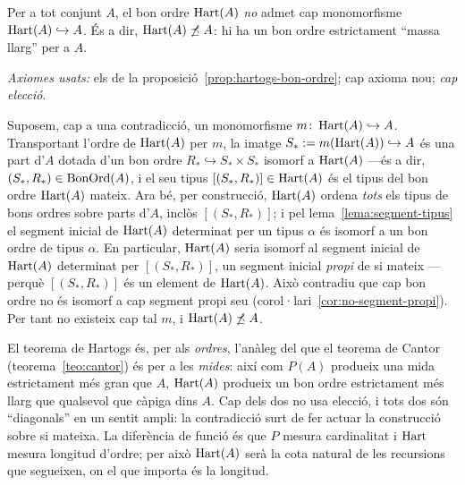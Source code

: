 \begin{teorema}[Hartogs]\label{teo:hartogs}
Per a tot conjunt \(A\), el bon ordre \(\operatorname{Hart}(A)\) \emph{no} admet cap
monomorfisme \(\operatorname{Hart}(A)\hookrightarrow A\). És a dir, \(\operatorname{Hart}(A)\not\preceq A\):
hi ha un bon ordre estrictament \enquote{massa llarg} per a \(A\).\par
\emph{Axiomes usats:} els de la proposició~\ref{prop:hartogs-bon-ordre}; cap
axioma nou; \emph{cap elecció}.
\end{teorema}

\begin{prova}
Suposem, cap a una contradicció, un monomorfisme \(m\colon\operatorname{Hart}(A)\hookrightarrow
A\). Transportant l'ordre de \(\operatorname{Hart}(A)\) per \(m\), la imatge
\(S_{*}:=m(\operatorname{Hart}(A))\hookrightarrow A\) és una part d'\(A\) dotada d'un bon
ordre \(R_{*}\hookrightarrow S_{*}\times S_{*}\) isomorf a \(\operatorname{Hart}(A)\) ---és a
dir, \((S_{*},R_{*})\in\operatorname{BonOrd}(A)\), i el seu tipus
\([(S_{*},R_{*})]\in\operatorname{Hart}(A)\) és el tipus del bon ordre \(\operatorname{Hart}(A)\) mateix.
Ara bé, per construcció, \(\operatorname{Hart}(A)\) ordena \emph{tots} els tipus de bons
ordres sobre parts d'\(A\), inclòs \([(S_{*},R_{*})]\); i pel
lema~\ref{lema:segment-tipus} el segment inicial de \(\operatorname{Hart}(A)\) determinat per
un tipus \(\alpha\) és isomorf a un bon ordre de tipus \(\alpha\). En
particular, \(\operatorname{Hart}(A)\) seria isomorf al segment inicial de \(\operatorname{Hart}(A)\)
determinat per \([(S_{*},R_{*})]\), un segment inicial \emph{propi} de si
mateix ---perquè \([(S_{*},R_{*})]\) és un element de \(\operatorname{Hart}(A)\). Això
contradiu que cap bon ordre no és isomorf a cap segment propi seu
(corol·lari~\ref{cor:no-segment-propi}). Per tant no existeix cap tal \(m\), i
\(\operatorname{Hart}(A)\not\preceq A\).
\end{prova}

\begin{observacio}\label{obs:hartogs-cantor}
El teorema de Hartogs és, per als \emph{ordres}, l'anàleg del que el teorema
de Cantor (teorema~\ref{teo:cantor}) és per a les \emph{mides}: així com
\(P(A)\) produeix una mida estrictament més gran que \(A\), \(\operatorname{Hart}(A)\)
produeix un bon ordre estrictament més llarg que qualsevol que càpiga dins
\(A\). Cap dels dos no usa elecció, i tots dos són \enquote{diagonals} en un
sentit ampli: la contradicció surt de fer actuar la construcció sobre si
mateixa. La diferència de funció és que \(P\) mesura cardinalitat i
\(\operatorname{Hart}\) mesura longitud d'ordre; per això \(\operatorname{Hart}(A)\) serà la cota natural
de les recursions que segueixen, on el que importa és la longitud.
\end{observacio}

